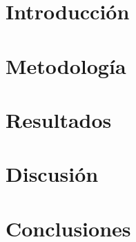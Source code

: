 

\section{Introducción}
\label{intro}



\section{Metodología}
\label{metodologia}


\section{Resultados}
\label{results}


\section{Discusión}
\label{discusion}


\section{Conclusiones}
\label{conclusiones}

